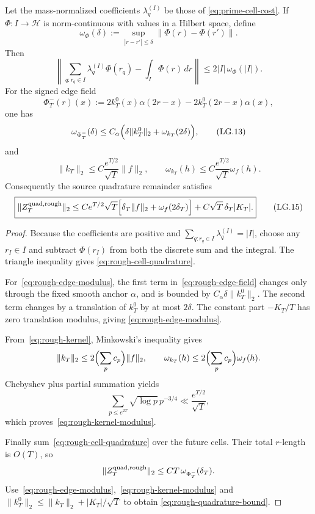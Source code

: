 \begin{lemma}
\label{lem:rough-prime-quadrature}
Let the mass-normalized coefficients $\lambda_q^{(I)}$ be those of
\eqref{eq:prime-cell-cost}.  If $\Phi:I\to\mathscr H$ is norm-continuous with values in
a Hilbert space, define
\[
 \omega_\Phi(\delta)
 :=\sup_{|r-r'|\le\delta}\|\Phi(r)-\Phi(r')\|.
\]
Then
\[
 \boxed{
 \left\|
 \sum_{q:r_q\in I}\lambda_q^{(I)}\Phi(r_q)
 -\int_I\Phi(r)\,dr
 \right\|
 \le2|I|\,\omega_\Phi(|I|).
 }
\tag{LG.11}\label{eq:rough-cell-quadrature}
\]
For the signed edge field
\[
 \Phi_T^-(r)(x)
 :=2k_T^0(x)\alpha(2r-x)
   -2k_T^0(2r-x)\alpha(x),
\tag{LG.12}\label{eq:rough-edge-field}
\]
one has
\[
 \omega_{\Phi_T^-}(\delta)
 \le C_\alpha\Bigl(
 \delta\|k_T^0\|_2+\omega_{k_T}(2\delta)
 \Bigr),
\tag{LG.13}\label{eq:rough-edge-modulus}
\]
and
\[
 \|k_T\|_2
 \le C\frac{e^{T/2}}{\sqrt T}\|f\|_2,
 \qquad
 \omega_{k_T}(h)
 \le C\frac{e^{T/2}}{\sqrt T}\omega_f(h).
\tag{LG.14}\label{eq:rough-kernel-modulus}
\]
Consequently the source quadrature remainder satisfies
\[
 \boxed{
 \|Z_T^{\rm quad,rough}\|_2
 \le C e^{T/2}\sqrt T
 \Bigl[\delta_T\|f\|_2+\omega_f(2\delta_T)\Bigr]
 +C\sqrt T\,\delta_T|K_T|.
 }
\tag{LG.15}\label{eq:rough-quadrature-bound}
\]
\end{lemma}

\begin{proof}
Because the coefficients are positive and
$\sum_{q:r_q\in I}\lambda_q^{(I)}=|I|$, choose any $r_I\in I$ and subtract
$\Phi(r_I)$ from both the discrete sum and the integral.  The triangle inequality gives
\eqref{eq:rough-cell-quadrature}.

For~\eqref{eq:rough-edge-modulus}, the first term in~\eqref{eq:rough-edge-field}
changes only through the fixed smooth anchor $\alpha$, and is bounded by
$C_\alpha\delta\|k_T^0\|_2$.  The second term changes by a translation of $k_T^0$ by
at most $2\delta$.  The constant part $-K_T/T$ has zero translation modulus, giving
\eqref{eq:rough-edge-modulus}.

From~\eqref{eq:rough-kernel}, Minkowski's inequality gives
\[
 \|k_T\|_2\le2\Bigl(\sum_pc_p\Bigr)\|f\|_2,
 \qquad
 \omega_{k_T}(h)\le2\Bigl(\sum_pc_p\Bigr)\omega_f(h).
\]
Chebyshev plus partial summation yields
\[
 \sum_{p\le e^{2T}}\sqrt{\log p}\,p^{-3/4}
 \ll\frac{e^{T/2}}{\sqrt T},
\]
which proves~\eqref{eq:rough-kernel-modulus}.

Finally sum~\eqref{eq:rough-cell-quadrature} over the future cells.  Their total
$r$-length is $O(T)$, so
\[
 \|Z_T^{\rm quad,rough}\|_2
 \le CT\,\omega_{\Phi_T^-}(\delta_T).
\]
Use~\eqref{eq:rough-edge-modulus},~\eqref{eq:rough-kernel-modulus} and
$\|k_T^0\|_2\le\|k_T\|_2+|K_T|/\sqrt T$ to obtain
\eqref{eq:rough-quadrature-bound}.
\end{proof}

